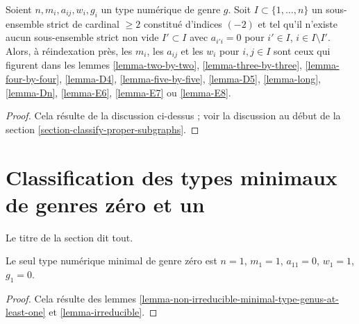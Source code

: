 \begin{proposition}
\label{proposition-classify-subgraphs}
Soient $n, m_i, a_{ij}, w_i, g_i$ un type numérique de genre $g$.
Soit $I \subset \{1, \ldots, n\}$ un sous-ensemble strict de cardinal $\geq 2$
constitué d'indices $(-2)$ et tel qu'il
n'existe aucun sous-ensemble strict non vide $I' \subset I$
avec $a_{i'i} = 0$ pour $i' \in I$, $i \in I \setminus I'$.
Alors, à réindexation près, les $m_i$, les $a_{ij}$ et les $w_i$
pour $i, j \in I$ sont ceux qui figurent dans les
lemmes \ref{lemma-two-by-two},
\ref{lemma-three-by-three},
\ref{lemma-four-by-four},
\ref{lemma-D4},
\ref{lemma-five-by-five},
\ref{lemma-D5},
\ref{lemma-long},
\ref{lemma-Dn},
\ref{lemma-E6},
\ref{lemma-E7} ou
\ref{lemma-E8}.
\end{proposition}

\begin{proof}
Cela résulte de la discussion ci-dessus ; voir la discussion au
début de la section \ref{section-classify-proper-subgraphs}.
\end{proof}













\section{Classification des types minimaux de genres zéro et un}
\label{section-classification-genus-one}

\noindent
Le titre de la section dit tout.

\begin{lemma}
\label{lemma-genus-zero}
Le seul type numérique minimal de genre zéro est
$n = 1$, $m_1 = 1$, $a_{11} = 0$, $w_1 = 1$, $g_1 = 0$.
\end{lemma}

\begin{proof}
Cela résulte des lemmes \ref{lemma-non-irreducible-minimal-type-genus-at-least-one}
et \ref{lemma-irreducible}.
\end{proof}

